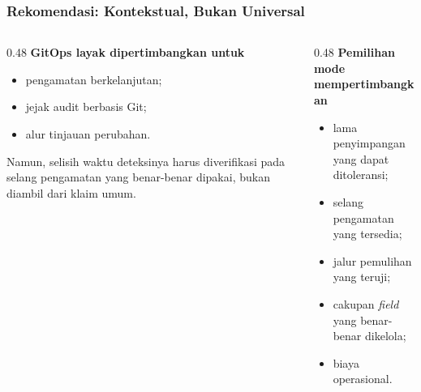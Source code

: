 {
\usebackgroundtemplate{\backgroundcontent}
\begin{frame}
    \frametitle{Rekomendasi: Kontekstual, Bukan Universal}
    \begin{columns}[T]
        \begin{column}{0.48\textwidth}
            \scriptsize
            \textbf{GitOps layak dipertimbangkan untuk}
            \begin{itemize}\setlength{\itemsep}{4pt}
                \item pengamatan berkelanjutan;
                \item jejak audit berbasis Git;
                \item alur tinjauan perubahan.
            \end{itemize}
            \vspace{0.08cm}
            Namun, selisih waktu deteksinya harus diverifikasi pada selang pengamatan yang benar-benar dipakai, bukan diambil dari klaim umum.
        \end{column}
        \begin{column}{0.48\textwidth}
            \scriptsize
            \textbf{Pemilihan mode mempertimbangkan}
            \begin{itemize}\setlength{\itemsep}{4pt}
                \item lama penyimpangan yang dapat ditoleransi;
                \item selang pengamatan yang tersedia;
                \item jalur pemulihan yang teruji;
                \item cakupan \textit{field} yang benar-benar dikelola;
                \item biaya operasional.
            \end{itemize}
        \end{column}
    \end{columns}
    \vspace{0.12cm}
\end{frame}
}

